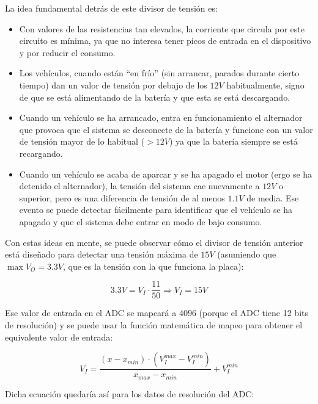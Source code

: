 La idea fundamental detrás de este divisor de tensión es:

\begin{itemize}
  \item Con valores de las resistencias tan elevados, la corriente que circula
        por este circuito es mínima, ya que no interesa tener picos de entrada
        en el dispositivo y por reducir el consumo.
  \item Los vehículos, cuando están ``en frío'' (sin arrancar, parados durante
        cierto tiempo) dan un valor de tensión por debajo de los $12V$ habitualmente,
        signo de que se está alimentando de la batería y que esta se está descargando.
  \item Cuando un vehículo se ha arrancado, entra en funcionamiento el alternador
        que provoca que el sistema se desconecte de la batería y funcione con un
        valor de tensión mayor de lo habitual ($> 12V$) ya que la batería siempre
        se está recargando.
  \item Cuando un vehículo se acaba de aparcar y se ha apagado el motor (ergo se
        ha detenido el alternador), la tensión del sistema cae nuevamente a $12V$
        o superior, pero es una diferencia de tensión de al menos $1.1V$ de media.
        Ese evento se puede detectar fácilmente para identificar que el vehículo se
        ha apagado y que el sistema debe entrar en modo de bajo consumo.
\end{itemize}

Con estas ideas en mente, se puede observar cómo el divisor de tensión anterior está
diseñado para detectar una tensión máxima de $15V$ (asumiendo que $\max{V_O} = 3.3V$,
que es la tensión con la que funciona la placa):

\begin{equation*}
  3.3V = V_I \cdot \frac{11}{50} \Longrightarrow V_I = 15V
\end{equation*}

Ese valor de entrada en el \ac{ADC} se mapeará a $4096$ (porque el \ac{ADC} tiene
12 bits de resolución) y se puede usar la función matemática de mapeo para obtener
el equivalente valor de entrada:

\begin{equation}\label{eq:map-function}
  V_I = \frac{\left(x - x_{min}\right) \cdot \left(V_I^{max} - V_I^{min}\right)}{x_{max} - x_{min}} + V_I^{min}
\end{equation}

Dicha ecuación quedaría así para los datos de resolución del \ac{ADC}:

